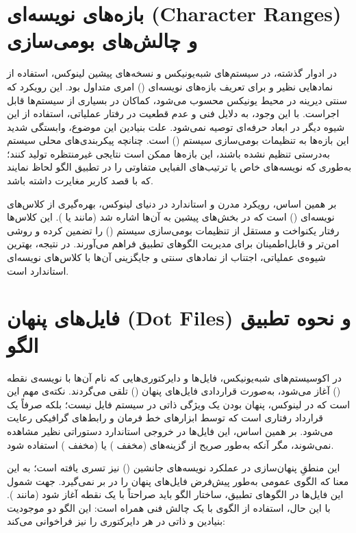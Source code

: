 \section{بازه‌های نویسه‌ای (Character Ranges) و چالش‌های بومی‌سازی}

در ادوار گذشته، در سیستم‌های شبه‌یونیکس و نسخه‌های پیشین لینوکس، استفاده از نمادهایی نظیر \cmd{[A-Z]} و \cmd{[a-z]} برای تعریف بازه‌های نویسه‌ای () امری متداول بود. این رویکرد که سنتی دیرینه در محیط یونیکس محسوب می‌شود، کماکان در بسیاری از سیستم‌ها قابل اجراست. با این وجود، به دلایل فنی و عدم قطعیت در رفتار عملیاتی، استفاده از این شیوه دیگر در ابعاد حرفه‌ای توصیه نمی‌شود. علت بنیادین این موضوع، وابستگی شدید این بازه‌ها به تنظیمات بومی‌سازی سیستم () است. چنانچه پیکربندی‌های محلی سیستم به‌درستی تنظیم نشده باشند، این بازه‌ها ممکن است نتایجی غیرمنتظره تولید کنند؛ به‌طوری که نویسه‌های خاص یا ترتیب‌های الفبایی متفاوتی را در تطبیق الگو لحاظ نمایند که با قصد کاربر مغایرت داشته باشد.

بر همین اساس، رویکرد مدرن و استاندارد در دنیای لینوکس، بهره‌گیری از کلاس‌های نویسه‌ای () است که در بخش‌های پیشین به آن‌ها اشاره شد (مانند \cmd{[:upper:]} یا \cmd{[:lower:]}). این کلاس‌ها رفتار یکنواخت و مستقل از تنظیمات بومی‌سازی سیستم () را تضمین کرده و روشی امن‌تر و قابل‌اطمینان برای مدیریت الگوهای تطبیق فراهم می‌آورند. در نتیجه، بهترین شیوه‌ی عملیاتی، اجتناب از نمادهای سنتی و جایگزینی آن‌ها با کلاس‌های نویسه‌ای استاندارد است.

\section{فایل‌های پنهان (Dot Files) و نحوه تطبیق الگو}

در اکوسیستم‌های شبه‌یونیکس، فایل‌ها و دایرکتوری‌هایی که نام آن‌ها با نویسه‌ی نقطه () آغاز می‌شود، به‌صورت قراردادی فایل‌های پنهان () تلقی می‌گردند. نکته‌ی مهم این است که در لینوکس، پنهان بودن یک ویژگی ذاتی در سیستم فایل نیست؛ بلکه صرفاً یک قرارداد رفتاری است که توسط ابزارهای خط فرمان و رابط‌های گرافیکی رعایت می‌شود. بر همین اساس، این فایل‌ها در خروجی استاندارد دستوراتی نظیر  مشاهده نمی‌شوند، مگر آنکه به‌طور صریح از گزینه‌های  (مخفف ) یا  (مخفف ) استفاده شود.

این منطقِ پنهان‌سازی در عملکرد نویسه‌های جانشین () نیز تسری یافته است؛ به این معنا که الگوی عمومی \cmd{*} به‌طور پیش‌فرض فایل‌های پنهان را در بر نمی‌گیرد. جهت شمول این فایل‌ها در الگوهای تطبیق، ساختار الگو باید صراحتاً با یک نقطه آغاز شود (مانند ). با این حال، استفاده از الگوی  با یک چالش فنی همراه است: این الگو دو موجودیت بنیادین و ذاتی در هر دایرکتوری را نیز فراخوانی می‌کند:

